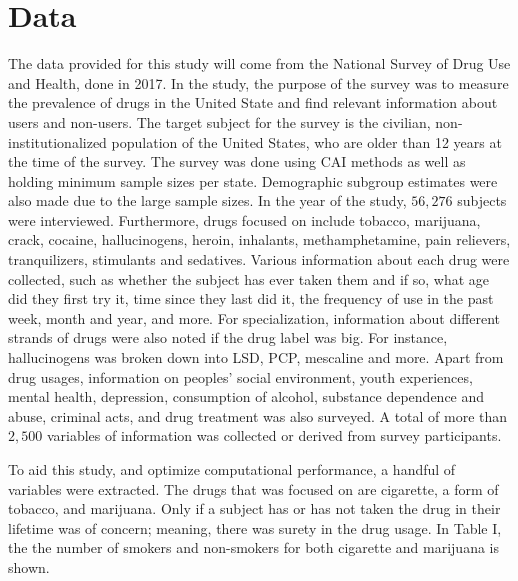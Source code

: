 \documentclass[a4paper, 10pt, conference]{ieeeconf}
\begin{document}
\section{Data}

The data provided for this study will come from the National Survey of Drug Use and Health, done in 2017. In the study, the purpose of the survey was to measure the prevalence of drugs in the United State and find relevant information about users and non-users. The target subject for the survey is the civilian, non-institutionalized population of the United States, who are older than 12 years at the time of the survey. The survey was done using CAI methods as well as holding minimum sample sizes per state. Demographic subgroup estimates were also made due to the large sample sizes. In the year of the study, $56, 276$ subjects were interviewed. Furthermore, drugs focused on include tobacco, marijuana, crack, cocaine, hallucinogens, heroin, inhalants, methamphetamine, pain relievers, tranquilizers, stimulants and sedatives. Various information about each drug were collected, such as whether the subject has ever taken them and if so, what age did they first try it, time since they last did it, the frequency of use in the past week, month and year, and more. For specialization, information about different strands of drugs were also noted if the drug label was big. For instance, hallucinogens was broken down into LSD, PCP, mescaline and more. Apart from drug usages, information on peoples' social environment, youth experiences, mental health, depression, consumption of alcohol, substance dependence and abuse, criminal acts, and drug treatment was also surveyed. A total of more than $2,500$ variables of information was collected or derived from survey participants. 

To aid this study, and optimize computational performance, a handful of variables were extracted. The drugs that was focused on are cigarette, a form of tobacco, and marijuana. Only if a subject has or has not taken the drug in their lifetime was of concern; meaning, there was surety in the drug usage. In Table I, the the number of smokers and non-smokers for both cigarette and marijuana is shown. 


\end{document}

